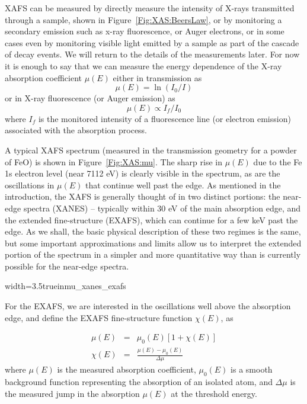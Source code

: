 XAFS can be measured by directly measure the intensity of X-rays
transmitted through a sample, shown in Figure~\ref{Fig:XAS:BeersLaw}, or by
monitoring a secondary emission such as x-ray fluorescence, or Auger
electrons, or in some cases even by monitoring visible light emitted by a
sample as part of the cascade of decay events.  We will return to the
details of the measurements later. For now it is enough to say that we can
measure the energy dependence of the X-ray absorption coefficient $\mu (E)$
either in transmission as
\begin{equation}
  \mu (E)=\ln (I_{0}/I)
\end{equation}
\noindent or in X-ray fluorescence (or Auger emission) as
\begin{equation}
  \mu(E) \propto I_{f}/I_{0}
\end{equation}
\noindent where $I_{f}$ is the monitored intensity of a fluorescence line
(or electron emission) associated with the absorption process.

A typical XAFS spectrum (measured in the transmission geometry for a powder
of FeO) is shown in Figure~\ref{Fig:XAS:mu}. The sharp rise in $\mu(E)$ due to
the Fe 1s electron level (near 7112 eV) is clearly visible in the spectrum,
as are the oscillations in $\mu(E)$ that continue well past the edge.  As
mentioned in the introduction, the XAFS is generally thought of in two
distinct portions: the near-edge spectra (XANES) -- typically within 30 eV
of the main absorption edge, and the extended fine-structure (EXAFS), which
can continue for a few keV past the edge.  As we shall, the basic physical
description of these two regimes is the same, but some important
approximations and limits allow us to interpret the extended portion of the
spectrum in a simpler and more quantitative way than is currently possible
for the near-edge spectra.

\begin{Nfig}{width=3.5truein}{mu_xanes_exafs}
  \caption{XAFS $\mu(E)$ for the Fe $K$ edge of FeO, showing
    the near-edge (XANES) region and
    the extended fine structure (EXAFS).}
  \label{Fig:XAS:mu}
\end{Nfig}

For the EXAFS, we are interested in the oscillations well above the
absorption edge, and define the EXAFS fine-structure function $\chi(E)$, as

\begin{eqnarray}
  \mu(E) &=& \mu_0(E) [ 1  + \chi(E)]  \\
  \chi(E) &=&   {\displaystyle  {\frac{{\mu(E) - \mu_0(E)}}{\Delta\mu}}}
  \label{Eq:mu2chi}
\end{eqnarray}
\noindent
where $\mu(E)$ is the measured absorption coefficient, $\mu_{0}(E)$ is a
smooth background function representing the absorption of an isolated atom,
and $\Delta \mu$ is the measured jump in the absorption $\mu(E)$ at
the threshold energy.


